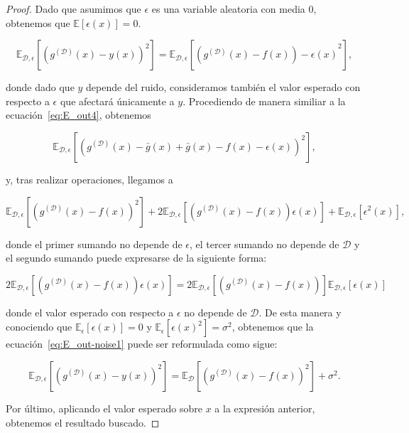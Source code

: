 \begin{proof}
    Dado que asumimos que $\epsilon$ es una variable aleatoria con media $0$, obtenemos que $\mathbb{E}[\epsilon(x)] = 0$.

    \begin{equation}\label{eq:E_out-noise1}
        \mathbb{E}_{\mathcal{D}, \epsilon}[{(g^{\mathcal{(D)}}(x) - y(x))}^2] = \mathbb{E}_{\mathcal{D}, \epsilon}[{(g^{\mathcal{(D)}}(x) - f(x)) - \epsilon(x)}^2],
    \end{equation}

    donde dado que $y$ depende del ruido, consideramos también el valor esperado con respecto a $\epsilon$ que afectará únicamente a $y$. Procediendo de manera similiar a la ecuación~\eqref{eq:E_out4}, obtenemos

    \begin{equation}
        \mathbb{E}_{\mathcal{D}, \epsilon}[{(g^{\mathcal{(D)}}(x) - \bar{g}(x) + \bar{g}(x) - f(x) - \epsilon(x))}^2],
    \end{equation}

    y, tras realizar operaciones, llegamos a

    \begin{equation}
        \mathbb{E}_{\mathcal{D}, \epsilon}[{(g^{\mathcal{(D)}}(x) - f(x))}^2] + 2\mathbb{E}_{\mathcal{D}, \epsilon}[(g^{\mathcal{(D)}}(x)-f(x))\epsilon(x)] + \mathbb{E}_{\mathcal{D}, \epsilon}[\epsilon^{2}(x)],
    \end{equation}

    donde el primer sumando no depende de $\epsilon$, el tercer sumando no depende de $\mathcal{D}$ y el segundo sumando puede expresarse de la siguiente forma:

    \begin{equation}
        2\mathbb{E}_{\mathcal{D}, \epsilon}[(g^{\mathcal{(D)}}(x)-f(x))\epsilon(x)] = 2\mathbb{E}_{\mathcal{D}, \epsilon}[(g^{\mathcal{(D)}}(x)-f(x))]\mathbb{E}_{\mathcal{D}, \epsilon}[\epsilon(x)]
    \end{equation}

    donde el valor esperado con respecto a $\epsilon$ no depende de $\mathcal{D}$. De esta manera y conociendo que $\mathbb{E}_{\epsilon}[\epsilon(x)] = 0$ y $\mathbb{E}_{\epsilon}[{\epsilon(x)}^{2}] = \sigma^{2}$, obtenemos que la ecuación~\eqref{eq:E_out-noise1} puede ser reformulada como sigue:

    \begin{equation}
        \mathbb{E}_{\mathcal{D}, \epsilon}[{(g^{\mathcal{(D)}}(x) - y(x))}^2] = \mathbb{E}_{\mathcal{D}}[{(g^{\mathcal{(D)}}(x) - f(x))}^2] + \sigma^{2}.
    \end{equation}

    Por último, aplicando el valor esperado sobre $x$ a la expresión anterior, obtenemos el resultado buscado.
\end{proof}

